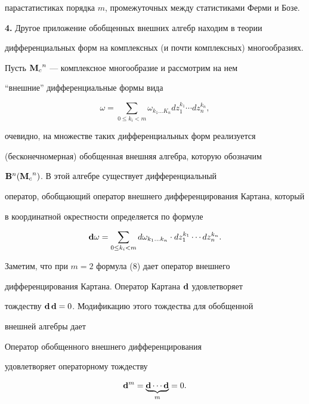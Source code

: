 парастатистиках порядка $m$, промежуточных между статистиками Ферми и Бозе.


\medskip





{\bf 4.} Другое приложение обобщенных внешних алгебр находим в теории


дифференциальных форм на комплексных (и почти комплексных) многообразиях.


Пусть ${\bold M_c}^n$ --- комплексное многообразие и рассмотрим на нем


``внешние'' дифференциальные формы вида


$$


\omega = \sum_{0\le k_i <m} \omega_{k_1\dotsc K_n}dz_1^{k_1}


\dotsb dz_n^{k_n},


$$


очевидно, на множестве таких дифференциальных форм реализуется


(бесконечномерная) обобщенная внешняя алгебра, которую обозначим


${\bold B}^n({\bold M_c}^n)$. В этой алгебре существует дифференциальный


оператор, обобщающий оператор внешнего дифференцирования Картана, который


в координатной окрестности определяется по формуле


\begin{equation}


{\bold d}\omega = \sum_{0\le k_i<m} d\omega_{k_1\dotsc k_n}\cdot


dz_1^{k_1}\dotsb dz_n^{k_n}.


\end{equation}


Заметим, что при $m=2$ формула (8) дает оператор внешнего


дифференцирования Картана. Оператор Картана ${\bold d}$ удовлетворяет


тождеству ${\bold d\,\bold d=0}$. Модификацию этого тождества для обобщенной


внешней алгебры дает





\begin{thm} Оператор обобщенного внешнего дифференцирования


удовлетворяет операторному тождеству


$$


{\bold d}^m= \underbrace{{\bold d \dotsb \bold d }}_m= 0.


$$


\end{thm}





